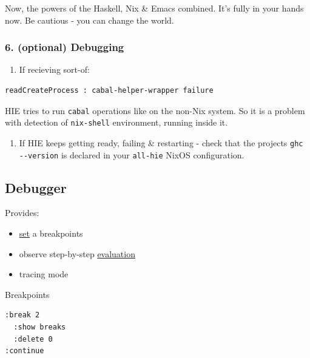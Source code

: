 \documentclass[11pt]{article}
\begin{document}
Now, the powers of the Haskell, Nix \& Emacs combined. It's fully in your hands now. Be cautious - you can change the world.\\

\subsubsection{6. (optional) Debugging}
\label{sec:org8d4149d}

\begin{enumerate}
\item If recieving sort-of:\\
\end{enumerate}

\begin{verbatim}
readCreateProcess : cabal-helper-wrapper failure
\end{verbatim}

HIE tries to run \texttt{cabal} operations like on the non-Nix system. So it is a problem with detection of \texttt{nix-shell} environment, running inside it.\\

\begin{enumerate}
\item If HIE keeps getting ready, failing \& restarting - check that the projects \texttt{ghc -{}-version} is declared in your \texttt{all-hie} NixOS configuration.\\
\end{enumerate}

\subsection{Debugger}
\label{sec:org2afcacf}

Provides:\\
\begin{itemize}
\item \hyperref[org1faf06d]{set} a breakpoints\\
\item observe step-by-step \hyperref[orgbb765d1]{evaluation}\\
\item tracing mode\\
\end{itemize}

Breakpoints\\
\begin{verbatim}
:break 2
  :show breaks
  :delete 0
:continue
\end{verbatim}
\end{document}
